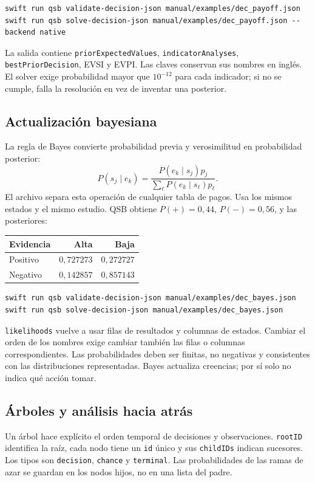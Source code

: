 \begin{lstlisting}
swift run qsb validate-decision-json manual/examples/dec_payoff.json
swift run qsb solve-decision-json manual/examples/dec_payoff.json --backend native
\end{lstlisting}
La salida contiene \texttt{priorExpectedValues}, \texttt{indicatorAnalyses},
\texttt{bestPriorDecision}, EVSI y EVPI. Las claves conservan sus nombres en
inglés. El solver exige probabilidad mayor que $10^{-12}$ para cada indicador;
si no se cumple, falla la resolución en vez de inventar una posterior.

\subsection{Actualización bayesiana}
La regla de Bayes convierte probabilidad previa y verosimilitud en probabilidad
posterior:
\[
 P(s_j\mid e_k)=\frac{P(e_k\mid s_j)p_j}{\sum_\ell P(e_k\mid s_\ell)p_\ell}.
\]
El archivo  separa esta operación de cualquier tabla de
pagos. Usa los mismos estados y el mismo estudio. QSB obtiene
$P(+)=0{,}44$, $P(-)=0{,}56$, y las posteriores:
\begin{center}
\begin{tabular}{lrr}
\toprule
Evidencia & Alta & Baja\\
\midrule
Positivo & $0{,}727273$ & $0{,}272727$\\
Negativo & $0{,}142857$ & $0{,}857143$\\
\bottomrule
\end{tabular}
\end{center}
\begin{lstlisting}
swift run qsb validate-decision-json manual/examples/dec_bayes.json
swift run qsb solve-decision-json manual/examples/dec_bayes.json
\end{lstlisting}
\texttt{likelihoods} vuelve a usar filas de resultados y columnas de estados.
Cambiar el orden de los nombres exige cambiar también las filas o columnas
correspondientes. Las probabilidades deben ser finitas, no negativas y
consistentes con las distribuciones representadas. Bayes actualiza creencias;
por sí solo no indica qué acción tomar.

\subsection{Árboles y análisis hacia atrás}
Un árbol hace explícito el orden temporal de decisiones y observaciones.
\texttt{rootID} identifica la raíz, cada nodo tiene un \texttt{id} único y sus
\texttt{childIDs} indican sucesores. Los tipos son \texttt{decision},
\texttt{chance} y \texttt{terminal}. Las probabilidades de las ramas de azar
se guardan en los nodos hijos, no en una lista del padre.

